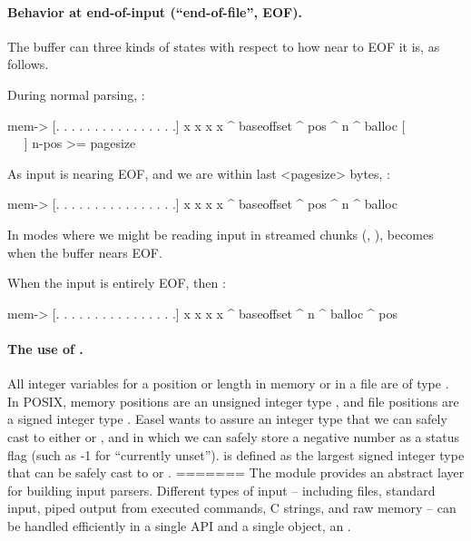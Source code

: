 \paragraph{Behavior at end-of-input (``end-of-file'', EOF).}

The buffer can three kinds of states with respect to how near to EOF
it is, as follows.

During normal parsing, :

\begin{cchunk}
  mem->  {[. . . . . . . . . . . . . . . .] x x x x}
           ^ baseoffset    ^ pos            ^ n   ^ balloc
                          [~ ~ ~ ~ ~ ~ ~ ~]
                          n-pos >= pagesize
\end{cchunk}

As input is nearing EOF, and we are within last <pagesize> bytes,
:

\begin{cchunk}
 mem->  {[. . . . . . . . . . . . . . . .] x x x x}
          ^ baseoffset              ^ pos  ^ n   ^ balloc
\end{cchunk}

In modes where we might be reading input in streamed chunks
(, 
),  becomes 
when the buffer nears EOF.

When the input is entirely EOF, then :

\begin{cchunk}
  mem->  {[. . . . . . . . . . . . . . . .] x x x x}
           ^ baseoffset                     ^ n   ^ balloc
                                            ^ pos
\end{cchunk}





\paragraph{ The use of . }

All integer variables for a position or length in memory or in a file
are of type . In POSIX, memory positions are an
unsigned integer type , and file positions are a signed
integer type . Easel wants to assure an integer type
that we can safely cast to either  or ,
and in which we can safely store a negative number as a status flag
(such as -1 for ``currently unset'').  is defined
as the largest signed integer type that can be safely cast to
 or .
=======
The  module provides an abstract layer for building
input parsers. Different types of input -- including files, standard
input, piped output from executed commands, C strings, and raw memory
-- can be handled efficiently in a single API and a single object, an
. 

